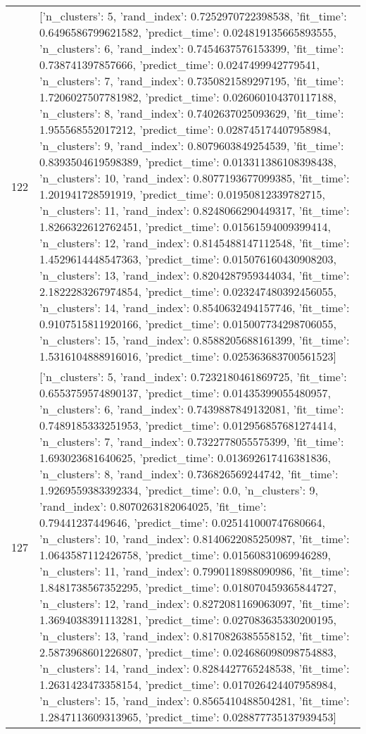 \begin{tabular}{rl}
122 & [{'n_clusters': 5, 'rand_index': 0.7252970722398538, 'fit_time': 0.6496586799621582, 'predict_time': 0.024819135665893555}, {'n_clusters': 6, 'rand_index': 0.7454637576153399, 'fit_time': 0.738741397857666, 'predict_time': 0.0247499942779541}, {'n_clusters': 7, 'rand_index': 0.7350821589297195, 'fit_time': 1.7206027507781982, 'predict_time': 0.026060104370117188}, {'n_clusters': 8, 'rand_index': 0.7402637025093629, 'fit_time': 1.955568552017212, 'predict_time': 0.028745174407958984}, {'n_clusters': 9, 'rand_index': 0.8079603849254539, 'fit_time': 0.8393504619598389, 'predict_time': 0.013311386108398438}, {'n_clusters': 10, 'rand_index': 0.8077193677099385, 'fit_time': 1.201941728591919, 'predict_time': 0.01950812339782715}, {'n_clusters': 11, 'rand_index': 0.8248066290449317, 'fit_time': 1.8266322612762451, 'predict_time': 0.01561594009399414}, {'n_clusters': 12, 'rand_index': 0.8145488147112548, 'fit_time': 1.4529614448547363, 'predict_time': 0.015076160430908203}, {'n_clusters': 13, 'rand_index': 0.8204287959344034, 'fit_time': 2.1822283267974854, 'predict_time': 0.023247480392456055}, {'n_clusters': 14, 'rand_index': 0.8540632494157746, 'fit_time': 0.9107515811920166, 'predict_time': 0.015007734298706055}, {'n_clusters': 15, 'rand_index': 0.8588205688161399, 'fit_time': 1.5316104888916016, 'predict_time': 0.025363683700561523}] \\
127 & [{'n_clusters': 5, 'rand_index': 0.7232180461869725, 'fit_time': 0.6553759574890137, 'predict_time': 0.01435399055480957}, {'n_clusters': 6, 'rand_index': 0.7439887849132081, 'fit_time': 0.7489185333251953, 'predict_time': 0.012956857681274414}, {'n_clusters': 7, 'rand_index': 0.7322778055575399, 'fit_time': 1.693023681640625, 'predict_time': 0.013692617416381836}, {'n_clusters': 8, 'rand_index': 0.736826569244742, 'fit_time': 1.9269559383392334, 'predict_time': 0.0}, {'n_clusters': 9, 'rand_index': 0.8070263182064025, 'fit_time': 0.79441237449646, 'predict_time': 0.025141000747680664}, {'n_clusters': 10, 'rand_index': 0.8140622085250987, 'fit_time': 1.0643587112426758, 'predict_time': 0.01560831069946289}, {'n_clusters': 11, 'rand_index': 0.7990118988090986, 'fit_time': 1.8481738567352295, 'predict_time': 0.018070459365844727}, {'n_clusters': 12, 'rand_index': 0.8272081169063097, 'fit_time': 1.3694038391113281, 'predict_time': 0.027083635330200195}, {'n_clusters': 13, 'rand_index': 0.8170826385558152, 'fit_time': 2.5873968601226807, 'predict_time': 0.024686098098754883}, {'n_clusters': 14, 'rand_index': 0.8284427765248538, 'fit_time': 1.2631423473358154, 'predict_time': 0.017026424407958984}, {'n_clusters': 15, 'rand_index': 0.8565410488504281, 'fit_time': 1.2847113609313965, 'predict_time': 0.028877735137939453}] \\

\end{tabular}
